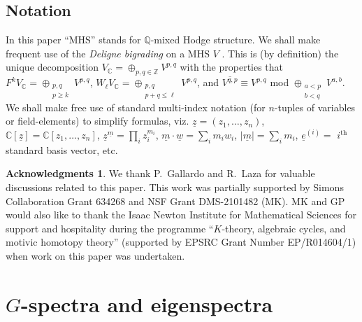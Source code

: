\documentclass[12pt,letterpaper,english]{amsart}
\numberwithin{equation}{section}
\numberwithin{figure}{section}
\theoremstyle{plain}
\theoremstyle{remark}
\theoremstyle{definition}
\theoremstyle{definition}
\theoremstyle{plain}
\theoremstyle{plain}
\theoremstyle{plain}
\theoremstyle{plain}
\theoremstyle{definition}
\def\um{\underline{m}}
\def\QQ{\mathbb{Q}}
\def\CC{\mathbb{C}}
\def\ZZ{\mathbb{Z}}
\def\uz{\underline{z}}
\def\uw{\underline{w}}
\def\ue{\underline{e}}
\theoremstyle{definition}
\newtheorem*{thx}{Acknowledgments}
\begin{document}
\subsection*{Notation}
In this paper ``MHS'' stands for $\QQ$-mixed Hodge structure.  We shall make frequent use of the \emph{Deligne bigrading} on a MHS $V$ \cite{De2}.  This is (by definition) the unique decomposition $V_{\CC}=\oplus_{p,q\in \ZZ} V^{p,q}$ with the properties that $F^k V_{\CC}=\oplus_{\substack{p,q \\ p\geq k}}V^{p,q}$, $W_{\ell}V_{\CC}=\oplus_{\substack{p,q \\ p+q\leq \ell}}V^{p,q}$, and $\overline{V^{q,p}}\equiv V^{p,q}$ mod $\oplus_{\substack{a<p \\ b<q}}V^{a,b}$.  We shall make free use of standard multi-index notation (for $n$-tuples of variables or field-elements) to simplify formulas, viz. $\uz=(z_1,\ldots,z_n)$, $\CC[\uz]=\CC[z_1,\ldots,z_n]$, $\uz^{\um}=\prod_i z_i^{m_i}$, $\um\cdot \uw=\sum_i m_iw_i$, $|\um|=\sum_i m_i$, $\ue^{(i)}=$  $i^{\text{th}}$ standard basis vector, etc.

\begin{thx}
We thank P.~Gallardo and R.~Laza for valuable discussions related to this paper.  This work was partially supported by Simons Collaboration Grant 634268 and NSF Grant DMS-2101482 (MK).  MK and GP would also like to thank the Isaac Newton Institute for Mathematical Sciences for support and hospitality during the programme ``$K$-theory, algebraic cycles, and motivic homotopy theory'' (supported by EPSRC Grant Number EP/R014604/1) when work on this paper was undertaken.
\end{thx}

\section{$G$-spectra and eigenspectra}\label{S1}
\end{document}
